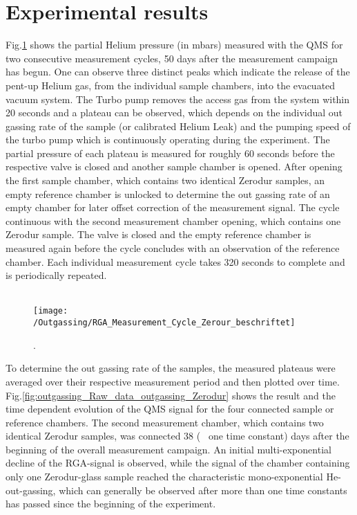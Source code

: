 \section{Experimental results}
Fig.\ref{fig:outgassing_cycle_example} shows the partial Helium pressure (in mbars) measured with the QMS for two consecutive measurement cycles, 50 days after the measurement campaign has begun. One can observe three distinct peaks which indicate the release of the pent-up Helium gas, from the individual sample chambers, into the evacuated vacuum system.
The Turbo pump removes the access gas from the system within 20 seconds and a plateau can be observed, which depends on the individual out gassing rate of the sample (or calibrated Helium Leak) and the pumping speed of the turbo pump which is continuously operating during the experiment. The partial pressure of each plateau is measured for roughly 60 seconds before the respective valve is closed and another sample chamber is opened. After opening the first sample chamber, which contains two identical Zerodur samples, an empty reference chamber is unlocked to determine the out gassing rate of an empty chamber for later offset correction of the measurement signal. The cycle continuous with the second measurement chamber opening, which contains one Zerodur sample. The valve is closed and the empty reference chamber is measured again before the cycle concludes with an observation of the reference chamber. Each individual measurement cycle takes 320 seconds to complete and is periodically repeated.\\\\
\noindent

\begin{figure}[H]
	\centering
	\texttt{[image: /Outgassing/RGA\_Measurement\_Cycle\_Zerour\_beschriftet]}
	\caption{.}
	\label{fig:outgassing_cycle_example}
\end{figure}


To determine the out gassing rate of the samples, the measured plateaus were averaged over their respective measurement period and then plotted over time. Fig.\ref{fig:outgassing_Raw_data_outgassing_Zerodur} shows the result and the time dependent evolution of the QMS signal for the four connected sample or reference chambers. The second measurement chamber, which contains two identical Zerodur samples, was connected 38 (~ one time constant) days after the beginning of the overall measurement campaign. An initial multi-exponential decline of the RGA-signal is observed, while the signal of the chamber containing only one Zerodur-glass sample reached the characteristic mono-exponential He-out-gassing, which can generally be observed after more than one time constants has passed since the beginning of the experiment.\\\\
\noindent


